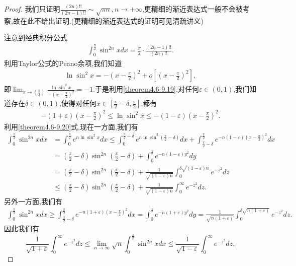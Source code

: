 \documentclass[../../main.tex]{subfiles}
\begin{document}
\begin{proof}
我们只证明$\frac{(2n)!!}{(2n-1)!!}\sim \sqrt{\pi n},n\rightarrow +\infty$,更精细的渐近表达式一般不会被考察,故在此不给出证明.(更精细的渐近表达式的证明可见清疏讲义)

注意到经典积分公式
\begin{align}\label{theorem4.6-1.1}
\int_{0}^{\frac{\pi}{2}}\sin^{2n}x dx=\frac{\pi}{2}\cdot\frac{(2n - 1)!!}{(2n)!!}.
\end{align}
利用Taylor公式的Peano余项,我们知道
\begin{align}\label{theorem4.6-9.19}
\ln\sin^{2}x=-\left(x - \frac{\pi}{2}\right)^{2}+o\left[\left(x - \frac{\pi}{2}\right)^{2}\right],
\end{align}
即\(\lim_{x\rightarrow(\frac{\pi}{2})}\frac{\ln\sin^{2}x}{-(x - \frac{\pi}{2})^{2}}=-1\).于是利用\eqref{theorem4.6-9.19},对任何\(\varepsilon\in(0,1)\),我们知道存在\(\delta\in(0,1)\),使得对任何\(x\in[\frac{\pi}{2}-\delta,\frac{\pi}{2}]\),都有
\begin{align}\label{theorem4.6-9.20}
-(1 + \varepsilon)\left(x - \frac{\pi}{2}\right)^{2}\leqslant\ln\sin^{2}x\leqslant-(1 - \varepsilon)\left(x - \frac{\pi}{2}\right)^{2}.
\end{align}
利用\eqref{theorem4.6-9.20}式,现在一方面,我们有
\begin{align*}
\int_{0}^{\frac{\pi}{2}}\sin^{2n}x dx&=\int_{0}^{\frac{\pi}{2}}e^{n\ln\sin^{2}x}dx
\leqslant\int_{0}^{\frac{\pi}{2}-\delta}e^{n\ln\sin^{2}(\frac{\pi}{2}-\delta)}dx+\int_{\frac{\pi}{2}-\delta}^{\frac{\pi}{2}}e^{-n(1 - \varepsilon)(x - \frac{\pi}{2})^{2}}dx\\
&=(\frac{\pi}{2}-\delta)\sin^{2n}(\frac{\pi}{2}-\delta)+\int_{0}^{\delta}e^{-n(1 - \varepsilon)y^{2}}dy\\
&=(\frac{\pi}{2}-\delta)\sin^{2n}(\frac{\pi}{2}-\delta)+\frac{1}{\sqrt{(1 - \varepsilon)n}}\int_{0}^{\delta\sqrt{(1 - \varepsilon)n}}e^{-z^{2}}dz\\
&\leqslant(\frac{\pi}{2}-\delta)\sin^{2n}(\frac{\pi}{2}-\delta)+\frac{1}{\sqrt{(1 - \varepsilon)n}}\int_{0}^{\infty}e^{-z^{2}}dz.
\end{align*}
另外一方面,我们有
\begin{align*}
\int_{0}^{\frac{\pi}{2}}\sin^{2n}x dx\geqslant\int_{\frac{\pi}{2}-\delta}^{\frac{\pi}{2}}e^{-n(1 + \varepsilon)(x - \frac{\pi}{2})^{2}}dx
=\int_{0}^{\delta}e^{-n(1 + \varepsilon)y^{2}}dy
=\frac{1}{\sqrt{n(1 + \varepsilon)}}\int_{0}^{\delta\sqrt{n(1 + \varepsilon)}}e^{-z^{2}}dz.
\end{align*}
因此我们有
\[
\frac{1}{\sqrt{1 + \varepsilon}}\int_{0}^{\infty}e^{-z^{2}}dz\leqslant\lim_{n\rightarrow\infty}\sqrt{n}\int_{0}^{\frac{\pi}{2}}\sin^{2n}x dx\leqslant\frac{1}{\sqrt{1 - \varepsilon}}\int_{0}^{\infty}e^{-z^{2}}dz,
\]
\end{proof}
\end{document}
